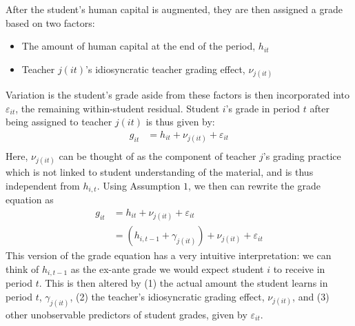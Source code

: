 \documentclass{article}
\begin{document}
\noindent After the student's human capital is augmented, they are then assigned a grade based on two factors:
\begin{itemize}
	\item The amount of human capital at the end of the period, $h_{it}$
	\item Teacher $j(it)$'s idiosyncratic teacher grading effect, $\nu_{j(it)}$
\end{itemize}
Variation is the student's grade aside from these factors is then incorporated into $\varepsilon_{it}$, the remaining within-student residual. Student $i$'s grade in period $t$ after being assigned to teacher $j(it)$ is thus given by:
\begin{equation}
\begin{split}
 	g_{it} & = h_{it}+\nu_{j(it)}+\varepsilon_{it}\\
\end{split}
\end{equation}
Here, $\nu_{j(it)}$ can be thought of as the component of teacher $j$'s grading practice which is not linked to student understanding of the material, and is thus independent from $h_{i,t}$. Using Assumption $1$, we then can rewrite the grade equation as 
\begin{equation}
\begin{split}
	\label{eqn:grade_eqn}
 	g_{it} & = h_{it}+\nu_{j(it)}+\varepsilon_{it}\\\
 	& = (h_{i,t-1} + \gamma_{j(it)}) + \nu_{j(it)} + \varepsilon_{it}
\end{split}
\end{equation}
This version of the grade equation has a very intuitive interpretation: we can think of $h_{i,t-1}$ as the ex-ante grade we would expect student $i$ to receive in period $t$. This is then altered by (1) the actual amount the student learns in period $t$, $\gamma_{j(it)}$, (2) the teacher's idiosyncratic grading effect, $\nu_{j(it)}$, and (3) other unobservable predictors of student grades, given by $\varepsilon_{it}$. 
\end{document}

